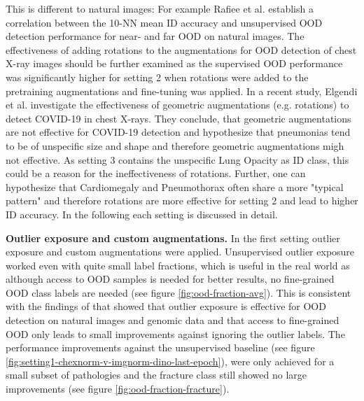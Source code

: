 This is different to natural images: For example Rafiee et al. \citep{Rafiee2022} establish a correlation between the 10-NN mean ID accuracy and unsupervised OOD detection performance for near- and far OOD on natural images.
The effectiveness of adding rotations to the augmentations for OOD detection of chest X-ray images should be further examined as the supervised OOD performance was significantly higher for setting 2 when rotations were added to the pretraining augmentations and fine-tuning was applied.
In a recent study, Elgendi et al. \citep{Elgendi2021} investigate the effectiveness of geometric augmentations (e.g. rotations) to detect COVID-19 in chest X-rays.
They conclude, that geometric augmentations are not effective for COVID-19 detection and hypothesize \citep{Elgendi2021} that pneumonias tend to be of unspecific size and shape and therefore geometric augmentations migh not effective.
As setting 3 contains the unspecific Lung Opacity as ID class, this could be a reason for the ineffectiveness of rotations.
Further, one can hypothesize that Cardiomegaly and Pneumothorax often share a more "typical pattern" and therefore rotations are more effective for setting 2 and lead to higher ID accuracy.
In the following each setting is discussed in detail.
\par
\textbf{Outlier exposure and custom augmentations.}
In the first setting outlier exposure and custom augmentations were applied.
Unsupervised outlier exposure worked even with quite small label fractions, which is useful in the real world as although access to OOD samples is needed for better results, no fine-grained OOD class labels are needed (see figure \ref{fig:ood-fraction-avg}).
This is consistent with the findings of \citep{Fort2021} that showed that outlier exposure is effective for OOD detection on natural images and genomic data and that access to fine-grained OOD only leads to small improvements against ignoring the outlier labels.
The performance improvements against the unsupervised baseline (see figure \ref{fig:setting1-chexnorm-v-imgnorm-dino-last-epoch}), were only achieved for a small subset of pathologies and the fracture class still showed no large improvements (see figure \ref{fig:ood-fraction-fracture}).
